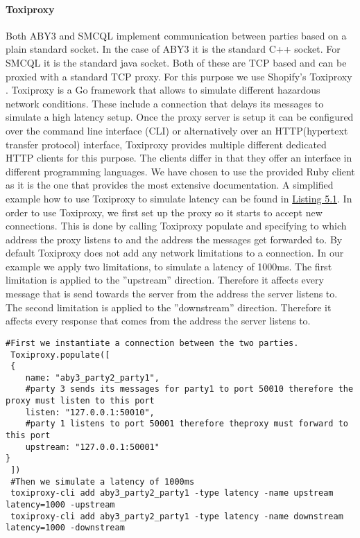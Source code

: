  \paragraph{Toxiproxy}
 Both ABY3 and SMCQL implement communication between parties based on a plain standard socket. In the case of ABY3 it is the standard C++ socket. For SMCQL it is the standard java socket. Both of these are TCP based and can be proxied with a standard TCP proxy. For this purpose we use Shopify's Toxiproxy \cite{toxiproxy}. Toxiproxy is a Go framework that allows to simulate different hazardous network conditions. These include a connection that delays its messages to simulate a high latency setup. Once the proxy server is setup it can be configured over the command line interface (CLI) or alternatively over an HTTP(hypertext transfer protocol) interface, Toxiproxy provides multiple different dedicated HTTP clients for this purpose. The clients differ in that they offer an interface in different programming languages. We have chosen to use the provided Ruby client as it is the one that provides the most extensive documentation. 
 A simplified example how to use Toxiproxy to simulate latency can be found in \hyperref[the_label]{Listing 5.1}. In order to use Toxiproxy, we first set up the proxy so it starts to accept new connections. This is done by calling Toxiproxy populate and specifying to which address the proxy listens to and the address the messages get forwarded to.
 By default Toxiproxy does not add any network limitations to a connection. In our example we apply two limitations, to simulate a latency of 1000ms. The first limitation is applied to the ''upstream'' direction. Therefore it affects every message that is send towards the server from the address the server listens to. The second limitation is applied to the ''downstream'' direction. Therefore it affects every response that comes from the address the server listens to.    
 
 \label{Toxi_label}				
 \begin{lstlisting}[caption={Setting up a proxy that simulates latency between two parties with Toxiporxy}]
 #First we instantiate a connection between the two parties. 
 Toxiproxy.populate([
 {
 	name: "aby3_party2_party1",
 	#party 3 sends its messages for party1 to port 50010 therefore the proxy must listen to this port
 	listen: "127.0.0.1:50010",   
 	#party 1 listens to port 50001 therefore theproxy must forward to this port
 	upstream: "127.0.0.1:50001"  
}
 ])
 #Then we simulate a latency of 1000ms 
 toxiproxy-cli add aby3_party2_party1 -type latency -name upstream latency=1000 -upstream
 toxiproxy-cli add aby3_party2_party1 -type latency -name downstream latency=1000 -downstream
 
 \end{lstlisting}
